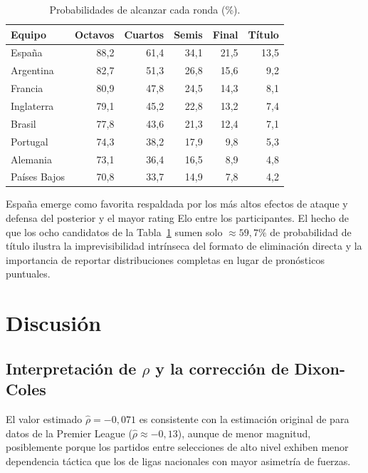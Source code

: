 \documentclass[12pt,a4paper]{article}
\begin{document}
\begin{table}[H]
\centering
\caption{Probabilidades de alcanzar cada ronda (\%).}
\label{tab:knockout}
\begin{tabular}{lrrrrr}
\toprule
\textbf{Equipo} & \textbf{Octavos} & \textbf{Cuartos} & \textbf{Semis} & \textbf{Final} & \textbf{Título} \\
\midrule
España       & 88{,}2 & 61{,}4 & 34{,}1 & 21{,}5 & 13{,}5 \\
Argentina    & 82{,}7 & 51{,}3 & 26{,}8 & 15{,}6 &  9{,}2 \\
Francia      & 80{,}9 & 47{,}8 & 24{,}5 & 14{,}3 &  8{,}1 \\
Inglaterra   & 79{,}1 & 45{,}2 & 22{,}8 & 13{,}2 &  7{,}4 \\
Brasil       & 77{,}8 & 43{,}6 & 21{,}3 & 12{,}4 &  7{,}1 \\
Portugal     & 74{,}3 & 38{,}2 & 17{,}9 &  9{,}8 &  5{,}3 \\
Alemania     & 73{,}1 & 36{,}4 & 16{,}5 &  8{,}9 &  4{,}8 \\
Países Bajos & 70{,}8 & 33{,}7 & 14{,}9 &  7{,}8 &  4{,}2 \\
\bottomrule
\end{tabular}
\end{table}

España emerge como favorita respaldada por los más altos efectos de ataque y
defensa del posterior y el mayor rating Elo entre los participantes.
El hecho de que los ocho candidatos de la Tabla~\ref{tab:knockout} sumen
solo $\approx 59{,}7\%$ de probabilidad de título ilustra la imprevisibilidad
intrínseca del formato de eliminación directa y la importancia de reportar
distribuciones completas en lugar de pronósticos puntuales.

\section{Discusión}
\label{sec:discussion}

\subsection{Interpretación de $\rho$ y la corrección de Dixon-Coles}

El valor estimado $\hat{\rho} = -0{,}071$ es consistente con la estimación
original de \citet{dixon1997modelling} para datos de la Premier League
($\hat{\rho} \approx -0{,}13$), aunque de menor magnitud, posiblemente
porque los partidos entre selecciones de alto nivel exhiben menor dependencia
táctica que los de ligas nacionales con mayor asimetría de fuerzas.
\end{document}
